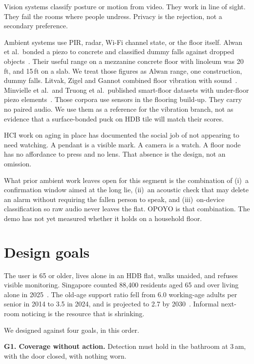 \documentclass[sigconf]{acmart}
\begin{document}
Vision systems classify posture or motion from video. They work in line of sight. They fail the rooms where people undress. Privacy is the rejection, not a secondary preference.

Ambient systems use PIR, radar, Wi-Fi channel state, or the floor itself. Alwan et al.\ bonded a piezo to concrete and classified dummy falls against dropped objects~\cite{alwan2006}. Their useful range on a mezzanine concrete floor with linoleum was 20\,ft, and 15\,ft on a slab. We treat those figures as Alwan range, one construction, dummy falls. Litvak, Zigel and Gannot combined floor vibration with sound~\cite{litvak2008}. Minvielle et al.\ and Truong et al.\ published smart-floor datasets with under-floor piezo elements~\cite{minvielle2017,truong2023}. Those corpora use sensors in the flooring build-up. They carry no paired audio. We use them as a reference for the vibration branch, not as evidence that a surface-bonded puck on HDB tile will match their scores.

HCI work on aging in place has documented the social job of not appearing to need watching. A pendant is a visible mark. A camera is a watch. A floor node has no affordance to press and no lens. That absence is the design, not an omission.

What prior ambient work leaves open for this segment is the combination of (i)~a confirmation window aimed at the long lie, (ii)~an acoustic check that may delete an alarm without requiring the fallen person to speak, and (iii)~on-device classification so raw audio never leaves the flat. OPOYO is that combination. The demo has not yet measured whether it holds on a household floor.

\section{Design goals}

The user is 65 or older, lives alone in an HDB flat, walks unaided, and refuses visible monitoring. Singapore counted 88{,}400 residents aged 65 and over living alone in 2025~\cite{singstat2024}. The old-age support ratio fell from 6.0 working-age adults per senior in 2014 to 3.5 in 2024, and is projected to 2.7 by 2030~\cite{mom2024}. Informal next-room noticing is the resource that is shrinking.

We designed against four goals, in this order.

\textbf{G1. Coverage without action.} Detection must hold in the bathroom at 3\,am, with the door closed, with nothing worn.
\end{document}

